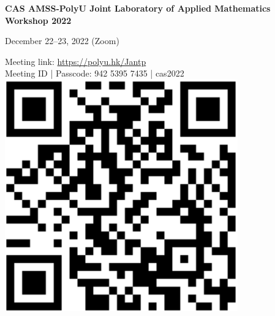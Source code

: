 \documentclass[
	openany, %
	parskip=full, %
	12pt, %
	a4paper, %
]{conferencebooklet} %
\begin{document}
\vspace*{3cm}
\begin{center}

%
%


\thispagestyle{empty}
\LARGE\textbf{CAS AMSS-PolyU Joint Laboratory of Applied Mathematics Workshop 2022}




\vspace*{2cm}
\Large

December 22--23, 2022 (Zoom)

Meeting link: \url{https://polyu.hk/Jantp}\\
\vspace{0.5cm}
Meeting ID | Passcode: 942 5395 7435 | cas2022\\
\vspace{0.6cm}
\includegraphics[scale=0.5]{qrcode.png}

\end{center}




\setcounter{page}{0}



\end{document}
